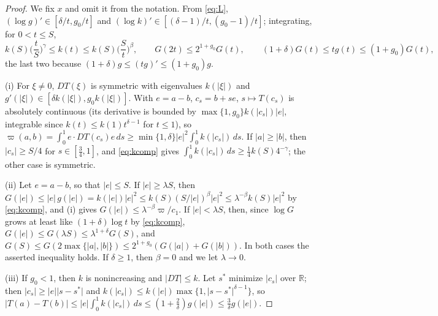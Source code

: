 \documentclass[11pt]{amsart}
\theoremstyle{definition}
\theoremstyle{remark}
\numberwithin{equation}{section}
\newcommand{\R}{\mathbb{R}}
\newcommand{\abs}[1]{\lvert #1\rvert}
\begin{document}
\begin{proof}
We fix $x$ and omit it from the notation. From \eqref{eq:L}, $(\log g)'\in[\delta/t,g_0/t]$ and $(\log k)'\in[(\delta-1)/t,(g_0-1)/t]$; integrating, for $0<t\le S$,
\begin{equation}\label{eq:kcomp}
k(S)\Big(\frac tS\Big)^{\gamma}\le k(t)\le k(S)\Big(\frac St\Big)^{\beta},\qquad
G(2t)\le2^{1+g_0}G(t),\qquad (1+\delta)G(t)\le tg(t)\le(1+g_0)G(t),
\end{equation}
the last two because $(1+\delta)g\le(tg)'\le(1+g_0)g$.

(i) For $\xi\ne0$, $DT(\xi)$ is symmetric with eigenvalues $k(\abs\xi)$ and $g'(\abs\xi)\in[\delta k(\abs\xi),g_0k(\abs\xi)]$. With $e=a-b$, $c_s=b+se$, $s\mapsto T(c_s)$ is absolutely continuous (its derivative is bounded by $\max\{1,g_0\}k(\abs{c_s})\abs e$, integrable since $k(t)\le k(1)t^{\delta-1}$ for $t\le1$), so $\varpi(a,b)=\int_0^1e\cdot DT(c_s)e\,ds\ge\min\{1,\delta\}\abs e^2\int_0^1k(\abs{c_s})\,ds$. If $\abs a\ge\abs b$, then $\abs{c_s}\ge S/4$ for $s\in[\frac34,1]$, and \eqref{eq:kcomp} gives $\int_0^1k(\abs{c_s})\,ds\ge\frac14k(S)4^{-\gamma}$; the other case is symmetric.

(ii) Let $e=a-b$, so that $\abs e\le S$. If $\abs e\ge\lambda S$, then $G(\abs e)\le\abs e\,g(\abs e)=k(\abs e)\abs e^2\le k(S)(S/\abs e)^\beta\abs e^2\le\lambda^{-\beta}k(S)\abs e^2$ by \eqref{eq:kcomp}, and (i) gives $G(\abs e)\le\lambda^{-\beta}\varpi/c_1$. If $\abs e<\lambda S$, then, since $\log G$ grows at least like $(1+\delta)\log t$ by \eqref{eq:kcomp}, $G(\abs e)\le G(\lambda S)\le\lambda^{1+\delta}G(S)$, and $G(S)\le G(2\max\{\abs a,\abs b\})\le2^{1+g_0}(G(\abs a)+G(\abs b))$. In both cases the asserted inequality holds. If $\delta\ge1$, then $\beta=0$ and we let $\lambda\to0$.

(iii) If $g_0<1$, then $k$ is nonincreasing and $\abs{DT}\le k$. Let $s^*$ minimize $\abs{c_s}$ over $\R$; then $\abs{c_s}\ge\abs e\abs{s-s^*}$ and $k(\abs{c_s})\le k(\abs e)\max\{1,\abs{s-s^*}^{\delta-1}\}$, so $\abs{T(a)-T(b)}\le\abs e\int_0^1k(\abs{c_s})\,ds\le(1+\frac2\delta)g(\abs e)\le\frac3\delta g(\abs e)$.
\end{proof}
\end{document}
